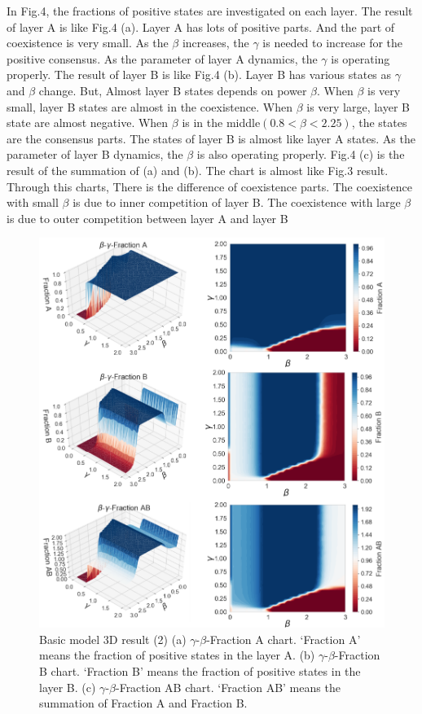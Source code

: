 \documentclass[english]{cccconf}
\begin{document}
In Fig.4, the fractions of positive states are investigated on each layer. The result of layer A is like Fig.4 (a). Layer A has lots of positive parts. And the part of coexistence is very small. As the $\beta$ increases, the $\gamma$ is needed to increase for the positive consensus. As the parameter of layer A dynamics, the $\gamma$ is operating properly. The result of layer B is like Fig.4 (b). Layer B has various states as $\gamma$ and $\beta$ change. But, Almost layer B states depends on power $\beta$.  When $\beta$ is very small, layer B states are almost in the coexistence. When $\beta$ is very large, layer B state are almost negative. When $\beta$ is in the middle$(0.8 < \beta < 2.25)$, the states are the consensus parts. The states of layer B is almost like layer A states. As the parameter of layer B dynamics, the $\beta$ is also operating properly. Fig.4 (c) is the result of the summation of (a) and (b). The chart is almost like Fig.3 result. Through this charts, 
There is the difference of coexistence parts. The coexistence with small $\beta$ is due to inner competition of layer B. The coexistence with large $\beta$ is due to outer competition between layer A and layer B
\begin{figure}[!htb]
  \centering
  \includegraphics[width=\hsize]{FIG4.png}
  \caption{Basic model 3D result (2) (a) $\gamma$-$\beta$-Fraction A chart. ‘Fraction A’ means the fraction of positive states in the layer A. (b) $\gamma$-$\beta$-Fraction B chart. ‘Fraction B’ means the fraction of positive states in the layer B. (c) $\gamma$-$\beta$-Fraction AB chart. ‘Fraction AB’ means the summation of Fraction A and Fraction B.}
  \label{Fig4}
\end{figure}
\end{document}
